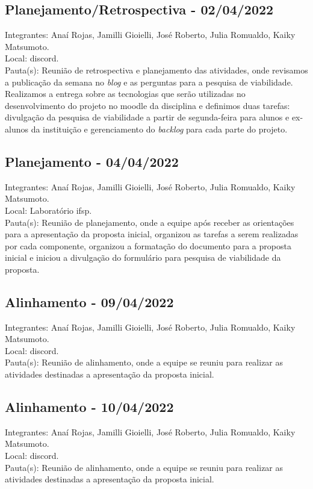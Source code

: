 \subsection{Planejamento/Retrospectiva - 02/04/2022}
\noindent Integrantes: Anaí Rojas, Jamilli Gioielli, José Roberto, Julia Romualdo, Kaiky Matsumoto. \\
Local: \gls{discord}.\\
Pauta(s): Reunião de retrospectiva e planejamento das atividades, onde revisamos a publicação da semana no \textsl{blog} e as perguntas para a pesquisa de viabilidade. Realizamos a entrega sobre as tecnologias que serão utilizadas no desenvolvimento do projeto no \gls{moodle} da disciplina e definimos duas tarefas: divulgação da pesquisa de viabilidade a partir de segunda-feira para alunos e ex-alunos da instituição e gerenciamento do \textsl{backlog} para cada parte do projeto.

\subsection{Planejamento - 04/04/2022}
\noindent Integrantes: Anaí Rojas, Jamilli Gioielli, José Roberto, Julia Romualdo, Kaiky Matsumoto. \\
Local: Laboratório \acs{ifsp}.\\
Pauta(s): Reunião de planejamento, onde a equipe após receber as orientações para a apresentação da proposta inicial, organizou as tarefas a serem realizadas por cada componente, organizou a formatação do documento para a proposta inicial e iniciou a divulgação do formulário para pesquisa de viabilidade da proposta.

\subsection{Alinhamento - 09/04/2022}
\noindent Integrantes: Anaí Rojas, Jamilli Gioielli, José Roberto, Julia Romualdo, Kaiky Matsumoto. \\
Local: \gls{discord}.\\
Pauta(s): Reunião de alinhamento, onde a equipe se reuniu para realizar as atividades destinadas a apresentação da proposta inicial.

\subsection{Alinhamento - 10/04/2022}
\noindent Integrantes: Anaí Rojas, Jamilli Gioielli, José Roberto, Julia Romualdo, Kaiky Matsumoto. \\
Local: \gls{discord}.\\
Pauta(s): Reunião de alinhamento, onde a equipe se reuniu para realizar as atividades destinadas a apresentação da proposta inicial.

